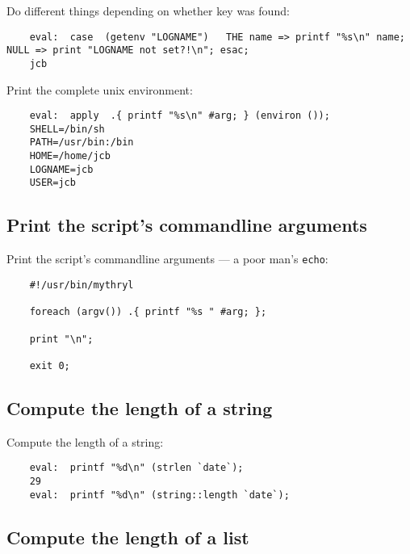 Do different things depending on whether 
key was found:
\begin{verbatim}
    eval:  case  (getenv "LOGNAME")   THE name => printf "%s\n" name; NULL => print "LOGNAME not set?!\n"; esac;
    jcb
\end{verbatim}

Print the complete unix environment:
\begin{verbatim}
    eval:  apply  .{ printf "%s\n" #arg; } (environ ());
    SHELL=/bin/sh
    PATH=/usr/bin:/bin
    HOME=/home/jcb
    LOGNAME=jcb
    USER=jcb
\end{verbatim}

\cutend*

\subsection{Print the script's commandline arguments}

Print the script's commandline arguments 
--- a poor man's {\tt echo}:
\begin{verbatim}
    #!/usr/bin/mythryl

    foreach (argv()) .{ printf "%s " #arg; };

    print "\n";

    exit 0;
\end{verbatim}

\cutend*

\subsection{Compute the length of a string}

Compute the length of a string:
\begin{verbatim}
    eval:  printf "%d\n" (strlen `date`);
    29
    eval:  printf "%d\n" (string::length `date`);
\end{verbatim}

\cutend*

\subsection{Compute the length of a list}


